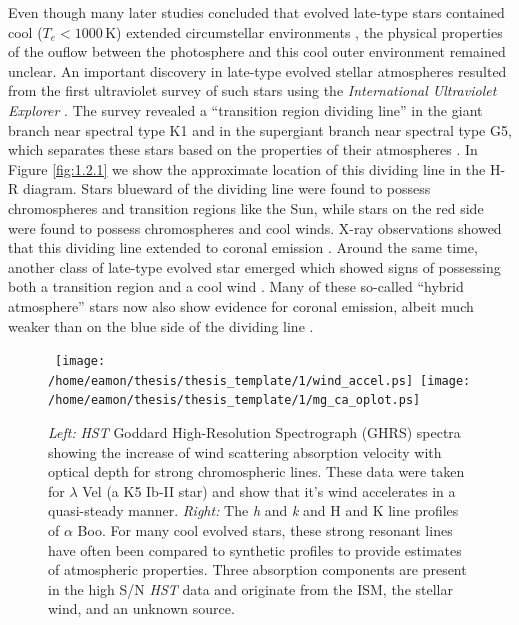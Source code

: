 Even though many later studies concluded that evolved late-type stars contained cool ($T_{e} < 1000$\,K) extended  circumstellar environments \citep[e.g.,][]{weymann_1962,gehrz_1971,bernat_1976,reimers_1975}, the physical properties of the ouflow between the photosphere and this cool outer environment remained unclear. An important discovery in late-type evolved stellar atmospheres resulted from the first ultraviolet survey of such stars using the \textit{International Ultraviolet Explorer} \citep[\textit{IUE};][]{macchetto_1978}. The survey revealed a ``transition region dividing line'' in the giant branch near spectral type K1 and in the supergiant branch near spectral type G5, which separates these stars based on the properties of their atmospheres \citep{linsky_1979, simon_1982}. In Figure \ref{fig:1.2.1} we show the approximate location of this dividing line in the H-R diagram. Stars blueward of the dividing line were found to possess chromospheres and transition regions like the Sun, while stars on the red side were found to possess chromospheres and cool winds. X-ray observations showed that this dividing line extended to coronal emission \citep{ayres_1981}. Around the same time, another class of late-type evolved star emerged which showed signs of possessing both a transition region and a cool wind \citep[e.g.,][]{reimers_1982}. Many of these so-called ``hybrid atmosphere'' stars now also show evidence for coronal emission, albeit much weaker than on the blue side of the dividing line \citep[e.g.,][]{ayres_1997}. 

\begin{figure}[hb!]
\centering 
\mbox{
          \texttt{[image: /home/eamon/thesis/thesis\_template/1/wind\_accel.ps]} 
          \texttt{[image: /home/eamon/thesis/thesis\_template/1/mg\_ca\_oplot.ps]}
          }
\caption[\textit{HST }strong chromospheric lines]{\textit{Left:} \textit{HST} Goddard High-Resolution Spectrograph (GHRS) spectra showing the increase of wind scattering absorption velocity with optical depth for strong chromospheric lines. These data were taken for $\lambda$ Vel (a K5 Ib-II star) and show that it's wind accelerates in a quasi-steady manner. \textit{Right:} The  \textit{h} and \textit{k} and  H and K line profiles of $\alpha$ Boo. For many cool evolved stars, these strong resonant lines have often been compared to synthetic profiles to provide estimates of atmospheric properties. Three absorption components are present in the high S/N \textit{HST} data and originate from the ISM, the stellar wind, and an unknown source.}
\label{fig:1.2.2}
\end{figure}

